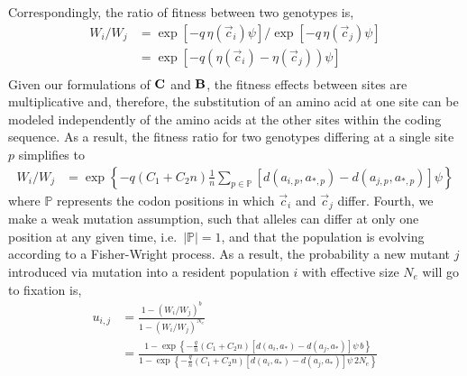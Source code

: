 \documentclass{article}
\newcommand{\Cost}{\ensuremath{\text{\textbf{C}}}\xspace}
\newcommand{\Func}{\ensuremath{\text{\textbf{B}}}\xspace}
\newcommand{\Ne}{\ensuremath{{N_e}}\xspace} %
\newcommand{\aip}{\ensuremath{a_{i,p}}\xspace}
\newcommand{\ajp}{\ensuremath{a_{j,p}}\xspace}
\newcommand{\aopt}{\ensuremath{a_*}\xspace}
\newcommand{\aoptp}{\ensuremath{a_{*,p}}\xspace}
\newcommand{\cveci}{\ensuremath{\cvec_i}\xspace}
\newcommand{\cvecj}{\ensuremath{\cvec_j}\xspace}
\newcommand{\cvec}{\ensuremath{\Vec{c}}\xspace}
\newcommand{\kmax}{\ensuremath{{k_{\max}}}\xspace}
\newcommand{\setP}{\ensuremath{\mathbb{P}}\xspace}
\begin{document}
Correspondingly, the ratio of fitness between two genotypes is,
\begin{align*}
  W_i/W_j &=  \exp\left[- q \, \eta(\cveci) \psi\right]/\exp\left[- q \, \eta(\cvecj) \psi\right]\\
  &=  \exp\left[- q \left(\eta(\cveci)- \eta(\cvecj)\right) \psi\right]\\
\end{align*}
Given our formulations of \Cost and \Func, the fitness effects between sites are multiplicative and, therefore, the substitution of an amino acid at one site can be modeled independently of the amino acids at the other sites within the coding sequence.
As a result, the fitness ratio for two genotypes differing at a single site $p$ simplifies to
\begin{align}
 W_i/W_j  &= \exp\left\{- q \left(C_1 + C_2 n\right) \frac{1}{n} \sum_{p \in \setP} \left[d\left(\aip,\aoptp\right) - d\left(\ajp,\aoptp\right)\right] \psi \right\}
\end{align}
where \setP represents the codon positions in which \cveci and \cvecj differ.
Fourth, we make a weak mutation assumption, such that alleles can differ at only one position at any given time, i.e.~$|\setP| = 1$, and that the population is evolving according to a Fisher-Wright process.
As a result, the probability a new mutant $j$ introduced via mutation into a resident population $i$ with effective size \Ne will go to fixation is,
\begin{align*}
  u_{i,j} &=  \frac{1 - \left(W_i/W_j\right)^b}{1 - \left(W_i/W_j\right)^\Ne}\\
   &= \frac{1- \exp\left\{- \frac{q}{n} \left(C_1 + C_2 n\right) \left[d\left(a_i,\aopt\right) - d\left(a_j,\aopt\right)\right] \psi \,  b\right\}}  {1-\exp\left\{- \frac{q}{n} \left(C_1 + C_2 n\right) \left[d\left(a_i,\aopt\right) - d\left(a_j,\aopt\right)\right] \psi \, 2\Ne\right\}}\\
\end{align*}
\end{document}

